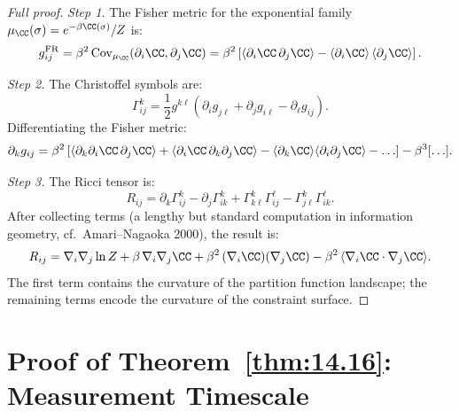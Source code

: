 \begin{proof}[Full proof]
\emph{Step 1.} The Fisher metric for the exponential family
$\mu_{\CC}(\sigma) = e^{-\beta\CC(\sigma)} / Z$ is:
\[
  g_{ij}^{\mathrm{FR}} = \beta^2\,\mathrm{Cov}_{\mu_\CC}
  (\partial_i\CC, \partial_j\CC)
  = \beta^2\left[\langle \partial_i\CC\,\partial_j\CC \rangle
  - \langle\partial_i\CC\rangle\,\langle\partial_j\CC\rangle\right].
\]

\emph{Step 2.} The Christoffel symbols are:
\[
  \Gamma^k_{ij} = \frac{1}{2}g^{k\ell}\left(
    \partial_i g_{j\ell} + \partial_j g_{i\ell}
    - \partial_\ell g_{ij}\right).
\]
Differentiating the Fisher metric:
\[
  \partial_k g_{ij} = \beta^2\left[
    \langle\partial_k\partial_i\CC\,\partial_j\CC\rangle
    + \langle\partial_i\CC\,\partial_k\partial_j\CC\rangle
    - \langle\partial_k\CC\rangle\langle\partial_i\partial_j\CC\rangle
    - \ldots
  \right] - \beta^3[\ldots].
\]

\emph{Step 3.} The Ricci tensor is:
\[
  R_{ij} = \partial_k\Gamma^k_{ij} - \partial_j\Gamma^k_{ik}
  + \Gamma^k_{k\ell}\Gamma^\ell_{ij}
  - \Gamma^k_{j\ell}\Gamma^\ell_{ik}.
\]
After collecting terms (a lengthy but standard computation in
information geometry, cf.~Amari--Nagaoka 2000), the result is:
\[
  R_{ij} = \nabla_i\nabla_j\ln Z
  + \beta\,\nabla_i\nabla_j\CC
  + \beta^2\,(\nabla_i\CC)(\nabla_j\CC)
  - \beta^2\,\langle\nabla_i\CC \cdot \nabla_j\CC\rangle.
\]
The first term contains the curvature of the partition function
landscape; the remaining terms encode the curvature of the
constraint surface.
\end{proof}

\section{Proof of Theorem~\ref{thm:14.16}: Measurement Timescale}
\label{app:pf-meas-time}

